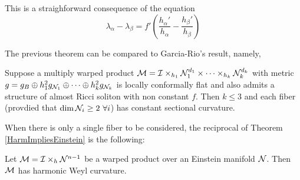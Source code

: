         \begin{demm}
            This is a straighforward consequence of the equation
            \[
        \lambda_{\alpha} - \lambda_{\beta} = f' \left(\frac{h_{\alpha}'}{h_{\alpha}}  - \frac{h_{\beta}'}{h_{\beta}} \right)
        \] 
        \end{demm}
        \begin{oobs}
            The previous theorem can be compared to Garcia-Rio's result, namely,

            \begin{teorema}
                Suppose a multiply warped product $\mathcal{M} = \mathcal{I} \times_{h_1} \mathcal{N}_1^{d_1} \times \cdots \times_{h_k} \mathcal{N}_{k}^{d_k}$ with metric $g = g_{B} \oplus h_1^2 g_{\mathcal{N}_1} \oplus \cdots \oplus h_{k}^2 g_{\mathcal{N}_k}$ is locally conformally flat and also admits a structure of almost Ricci soliton with non constant $f$. Then $k \leq 3$ and each fiber (provdied that $\dim \mathcal{N}_i \geq 2 \ \forall i$) has constant sectional curvature.
            \end{teorema}
        \end{oobs}


        
        When there is only a single fiber to be considered, the reciprocal of Theorem \cref{HarmImpliesEinstein} is the following:
        
        \begin{teorema}\label{harmWarp}
            Let $\mathcal{M} = \mathcal{I} \times_{h} \mathcal{N}^{n-1}$ be a warped product over an Einstein manifold $\mathcal{N}$. Then $\mathcal{M}$ has harmonic Weyl curvature.
        \end{teorema}
        
